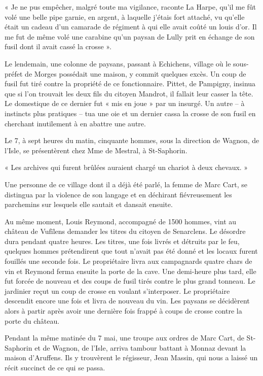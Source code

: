 \documentclass[french,twoside]{book} %
\newenvironment{quoteblock}%
  {\begin{quoting}}
  {\end{quoting}}
\newenvironment{quotebar}{%
    \def\FrameCommand{{\color{rubric!10!}\vrule width 0.5em} \hspace{0.9em}}%
    \def\OuterFrameSep{\itemsep} %
    \MakeFramed {\advance\hsize-\width \FrameRestore}
  }%
  {%
    \endMakeFramed
  }
\renewenvironment{quoteblock}%
  {%
    \savenotes
    \setstretch{0.9}
    \begin{quotebar}
  }
  {%
    \end{quotebar}
    \spewnotes
  }
\begin{document}
\begin{quoteblock}
 \noindent « Je ne pus empêcher, malgré toute ma vigilance, raconte La Harpe, qu’il me fût volé une belle pipe garnie, en argent, à laquelle j’étais fort attaché, vu qu’elle était un cadeau d’un camarade de régiment à qui elle avait coûté un louis d’or. Il me fut de même volé une carabine qu’un paysan de Lully prit en échange de son fusil dont il avait cassé la crosse ».
 \end{quoteblock}

\noindent Le lendemain, une colonne de paysans, passant à Echichens, village où le sous-préfet de Morges possédait une maison, y commit quelques excès. Un coup de fusil fut tiré contre la propriété de ce fonctionnaire. Pittet, de Pampigny, insinua que si l’on trouvait les deux fils du citoyen Mandrot, il fallait leur casser la tête. Le domestique de ce dernier fut « mis en joue » par un insurgé. Un autre – à instincts plus pratiques – tua une oie et un dernier cassa la crosse de son fusil en cherchant inutilement à en abattre une autre.\par
Le 7, à sept heures du matin, cinquante hommes, sous la direction de Wagnon, de l’Isle, se présentèrent chez Mme de Mestral, à St-Saphorin.\par

\begin{quoteblock}
\noindent « Les archives qui furent brûlées auraient chargé un chariot à deux chevaux. »\end{quoteblock}

\noindent Une personne de ce village dont il a déjà été parlé, la femme de Marc Cart, se distingua par la violence de son langage et en déchirant fiévreusement les parchemins sur lesquels elle sautait et dansait ensuite.\par
Au même moment, Louis Reymond, accompagné de 1500 hommes, vint au château de Vufïlens demander les titres du citoyen de Senarclens. Le désordre dura pendant quatre heures. Les titres, une fois livrés et détruits par le feu, quelques hommes prétendirent que tout n’avait pas été donné et les locaux furent fouillés une seconde fois. Le propriétaire livra aux campagnards quatre chars de vin et Reymond ferma ensuite la porte de la cave. Une demi-heure plus tard, elle fut forcée de nouveau et des coups de fusil tirés contre le plus grand tonneau. Le jardinier reçut un coup de crosse en voulant s’interposer. Le propriétaire descendit encore une fois et livra de nouveau du vin. Les paysans se décidèrent alors à partir après avoir une dernière fois frappé à coups de crosse contre la porte du château.\par
Pendant la même matinée du 7 mai, une troupe aux ordres de Marc Cart, de St-Saphorin et de Wagnon, de l’Isle, arriva tambour battant à Monnaz devant la maison d’Aruffens. Ils y trouvèrent le régisseur, Jean Massin, qui nous a laissé un récit succinct de ce qui se passa.\par
\end{document}
